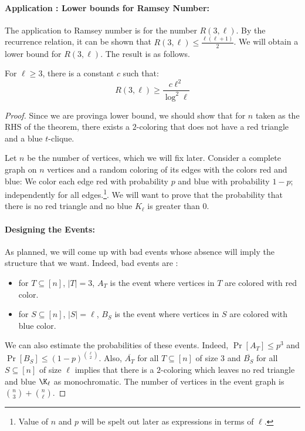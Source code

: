 \paragraph{Application : Lower bounds for Ramsey Number:}
The application to Ramsey number is for the number $R(3,\ell)$. By the recurrence relation, it can be shown that $R(3,\ell) \le \frac{\ell(\ell+1)}{2}$. We will obtain a lower bound for $R(3,\ell)$. The result is as follows.
\begin{theorem}
For $\ell \ge 3$, there is a constant $c$ such that:
$$R(3,\ell) \ge \frac{c\ell^2}{\log^2 \ell}$$
\end{theorem}
\begin{proof}
Since we are provinga lower bound, we should show that for $n$ taken as the RHS of the theorem, there exists a $2$-coloring that does not have a red triangle and a blue $t$-clique.

Let $n$ be the number of vertices, which we will fix later. Consider a complete graph on $n$ vertices and a random coloring of its edges with the colors red and blue: We color each edge red with probability $p$ and blue with probability $1-p$; independently for all edges.\footnote{Value of $n$ and $p$ will be spelt out later as expressions in terms of $\ell$.}. We will want to prove that the probability that there is no red triangle and no blue $K_\ell$ is greater than $0$.
\paragraph{Designing the Events:} As planned, we will come up with bad events whose absence will imply the structure that we want. Indeed, bad events are : 
\begin{itemize}
\item for $T \subseteq [n]$, $|T|=3$, $A_T$ is the event where vertices in $T$ are colored with red color.
\item for $S \subseteq [n]$, $|S|=\ell$, $B_S$ is the event where vertices in $S$ are colored with blue color.
\end{itemize}
We can also estimate the probabilities of these events. Indeed, $\Pr[A_T] \le p^3$ and $\Pr[B_S] \le (1-p)^{\ell \choose 2}$. Also, $\overline{A_T}$ for all $T \subseteq [n]$ of size $3$ and $\overline{B_S}$ for all $S \subseteq [n]$ of size $\ell$ implies that there is a $2$-coloring which leaves no red triangle and blue $\K_\ell$ as monochromatic. The number of vertices in the event graph is ${n \choose 3}+{n \choose \ell}$. 


\end{proof}
